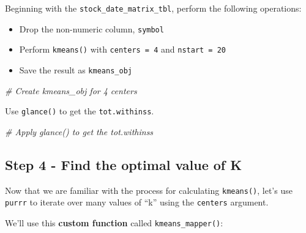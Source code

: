 \documentclass[
]{article}
\newenvironment{Shaded}{\begin{snugshade}}{\end{snugshade}}
\newcommand{\CommentTok}[1]{\textcolor[rgb]{0.56,0.35,0.01}{\textit{#1}}}
\newcommand{\ControlFlowTok}[1]{\textcolor[rgb]{0.13,0.29,0.53}{\textbf{#1}}}
\newcommand{\DataTypeTok}[1]{\textcolor[rgb]{0.13,0.29,0.53}{#1}}
\newcommand{\DecValTok}[1]{\textcolor[rgb]{0.00,0.00,0.81}{#1}}
\newcommand{\KeywordTok}[1]{\textcolor[rgb]{0.13,0.29,0.53}{\textbf{#1}}}
\newcommand{\NormalTok}[1]{#1}
\newcommand{\OperatorTok}[1]{\textcolor[rgb]{0.81,0.36,0.00}{\textbf{#1}}}
\newcommand{\StringTok}[1]{\textcolor[rgb]{0.31,0.60,0.02}{#1}}
\providecommand{\tightlist}{%
  \setlength{\itemsep}{0pt}\setlength{\parskip}{0pt}}
\begin{document}
Beginning with the \texttt{stock\_date\_matrix\_tbl}, perform the
following operations:

\begin{itemize}
\tightlist
\item
  Drop the non-numeric column, \texttt{symbol}
\item
  Perform \texttt{kmeans()} with \texttt{centers\ =\ 4} and
  \texttt{nstart\ =\ 20}
\item
  Save the result as \texttt{kmeans\_obj}
\end{itemize}

\begin{Shaded}
\begin{Highlighting}[]
\CommentTok{# Create kmeans_obj for 4 centers}
\end{Highlighting}
\end{Shaded}

Use \texttt{glance()} to get the \texttt{tot.withinss}.

\begin{Shaded}
\begin{Highlighting}[]
\CommentTok{# Apply glance() to get the tot.withinss}
\end{Highlighting}
\end{Shaded}

\hypertarget{step-4---find-the-optimal-value-of-k}{%
\subsection{Step 4 - Find the optimal value of
K}\label{step-4---find-the-optimal-value-of-k}}

Now that we are familiar with the process for calculating
\texttt{kmeans()}, let's use \texttt{purrr} to iterate over many values
of ``k'' using the \texttt{centers} argument.

We'll use this \textbf{custom function} called
\texttt{kmeans\_mapper()}:

\begin{Shaded}
\end{Shaded}
\end{document}
